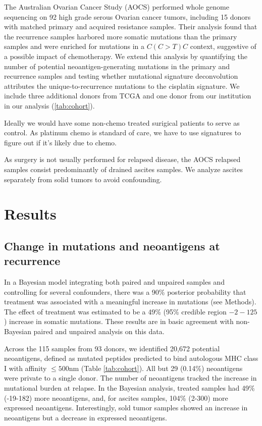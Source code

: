 The Australian Ovarian Cancer Study (AOCS)\cite{Patch_2015} performed whole genome sequencing on 92 high grade serous Ovarian cancer tumors, including 15 donors with matched primary and acquired resistance samples. Their analysis found that the recurrence samples harbored more somatic mutations than the primary samples and were enriched for mutations in a $C(C \gt T)C$ context, suggestive of a possible impact of chemotherapy. We extend this analysis by quantifying the number of potential neoantigen-generating mutations in the primary and recurrence samples and testing whether mutational signature deconvolution attributes the unique-to-recurrence mutations to the  cisplatin signature. We include three additional donors from TCGA and one donor from our institution in our analysis (\ref{tab:cohort}).

Ideally we would have some non-chemo treated surigical patients to serve as control. As platinum chemo is standard of care, we have to use signatures to figure out if it's likely due to chemo.

As surgery is not usually performed for relapsed disease, the AOCS relapsed samples consist predominantly of drained ascites samples. We analyze ascites separately from solid tumors to avoid confounding.



\section*{Results}

\subsection*{Change in mutations and neoantigens at recurrence}
In a Bayesian model integrating both paired and unpaired samples and controlling for several confounders, there was a 90\% posterior probability that treatment was associated with a meaningful increase in mutations (see Methods). The effect of treatment was estimated to be a 49\% (95\% credible region $-2-125$) increase in somatic mutations. These results are in basic agreement with non-Bayesian paired and unpaired analysis on this data.

Across the 115 samples from 93 donors, we identified 20,672 potential neoantigens, defined as mutated peptides predicted to bind autologous MHC class I with affinity $\leq 500$nm (Table \ref{tab:cohort}). All but 29 (0.14\%) neoantigens were private to a single donor. The number of neoantigens tracked the increase in mutational burden at relapse. In the Bayesian analysis, treated samples had 49\% (-19-182) more neoantigens, and, for ascites samples, 104\% (2-300) more expressed neoantigens. Interestingly, sold tumor samples showed an increase in neoantigens but a decrease in expressed neoantigens.


